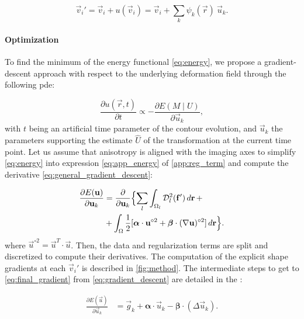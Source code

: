   \begin{equation}
  \vec{v}_i' = \vec{v}_i + u(\vec{v}_i) = \vec{v}_i + \sum_k \psi_k(\vec{r}) \: \vec{u}_k.
  \label{eq:nodes_tfm}
  \end{equation}


\paragraph*{Optimization}
\label{sec:gradient_descent}
To find the minimum of the energy functional \eqref{eq:energy},
  we propose a gradient-descent approach with respect to the underlying
  deformation field through the following \gls*{pde}:

  \begin{equation}
  \frac{\partial u(\vec{r},t)}{\partial t} \propto - \frac{\partial E(M \mid U)}{\partial \vec{u}_k},
  \label{eq:general_gradient_descent}
  \end{equation}
%
  with $t$ being an artificial time parameter of the contour
  evolution, and $\vec{u}_k$ the parameters supporting the estimate
  $\hat{U}$ of the transformation at the current time point.
Let us assume that anisotropy is aligned with the imaging axes to simplify
  \eqref{eq:energy} into expression \eqref{eq:app_energy} of \ref{app:reg_term}
  and compute the derivative \eqref{eq:general_gradient_descent}:

  \begin{align}
  \frac{\partial E(\vec{u})}{\partial \vec{u}_k} &=
  \frac{ \partial }{\partial \vec{u}_k} \Big\{
  \underset{l}{\sum} \int_{\Omega_l} \mdist{f'}{l} \,d\vec{r} \, + \notag\\
  &+ \int_{\Omega} \frac12 [ \boldsymbol{\alpha} \cdot \vec{u}^{\circ2}
  + \boldsymbol{\beta} \cdot (\nabla \vec{u})^{\circ2} ] \,d\vec{r}
  \Big\}.
  \label{eq:gradient_descent}
  \end{align}
%
  where $\vec{u}^{\circ2} = \vec{u}^T \cdot \vec{u}$.
Then, the data and regularization terms are split and discretized to compute their
  derivatives.
The computation of the explicit shape gradients at each $\vec{v}_i'$ is described in \autoref{fig:method}.
The intermediate steps to get to \eqref{eq:final_gradient} from \eqref{eq:gradient_descent} are
  detailed in the :

  \begin{align}
  \frac{\partial E(\vec{u})}{\partial \vec{u}_k} &=
  \vec{g}_k  + \boldsymbol{\alpha} \cdot \vec{u}_k - \boldsymbol{\beta} \cdot (\Delta \vec{u}_k).
  \label{eq:final_gradient}
  \end{align}

